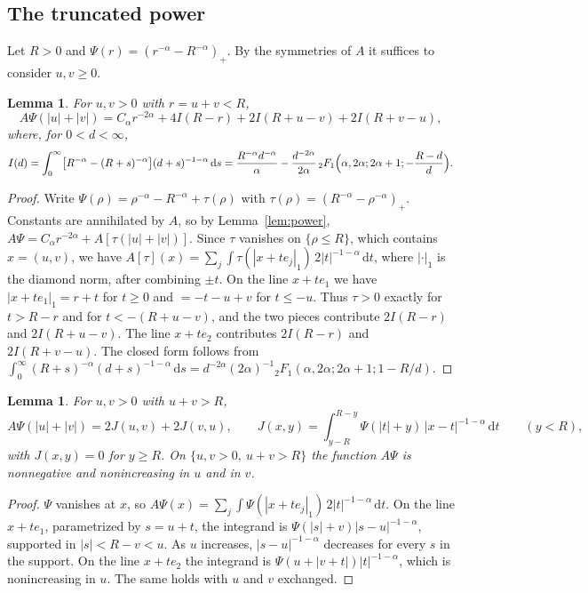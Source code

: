 \documentclass[11pt]{amsart}
\newtheorem{lemma}[equation]{Lemma}
\theoremstyle{definition}
\theoremstyle{remark}
\numberwithin{equation}{section}
\newcommand{\dd}{\,\mathrm{d}}
\begin{document}
\subsection{The truncated power} Let $R>0$ and $\Psi(r)=(r^{-\alpha}-R^{-\alpha})_+$. By the symmetries of $A$ it suffices to consider $u,v\ge0$.

\begin{lemma}\label{lem:inside}
For $u,v>0$ with $r=u+v<R$,
\[
A\Psi(|u|+|v|)=C_\alpha r^{-2\alpha}+4I(R-r)+2I(R+u-v)+2I(R+v-u),
\]
where, for $0<d<\infty$,
\[
I(d)=\int_0^\infty\bigl[R^{-\alpha}-(R+s)^{-\alpha}\bigr](d+s)^{-1-\alpha}\dd s=\frac{R^{-\alpha}d^{-\alpha}}{\alpha}-\frac{d^{-2\alpha}}{2\alpha}\,{}_2F_1\Bigl(\alpha,2\alpha;2\alpha+1;-\frac{R-d}{d}\Bigr).
\]
\end{lemma}

\begin{proof}
Write $\Psi(\rho)=\rho^{-\alpha}-R^{-\alpha}+\tau(\rho)$ with $\tau(\rho)=(R^{-\alpha}-\rho^{-\alpha})_+$. Constants are annihilated by $A$, so by Lemma~\ref{lem:power}, $A\Psi=C_\alpha r^{-2\alpha}+A[\tau(|u|+|v|)]$. Since $\tau$ vanishes on $\{\rho\le R\}$, which contains $x=(u,v)$, we have $A[\tau](x)=\sum_j\int\tau(|x+te_j|_1)\,2|t|^{-1-\alpha}\dd t$, where $|\cdot|_1$ is the diamond norm, after combining $\pm t$. On the line $x+te_1$ we have $|x+te_1|_1=r+t$ for $t\ge0$ and $=-t-u+v$ for $t\le-u$. Thus $\tau>0$ exactly for $t>R-r$ and for $t<-(R+u-v)$, and the two pieces contribute $2I(R-r)$ and $2I(R+u-v)$. The line $x+te_2$ contributes $2I(R-r)$ and $2I(R+v-u)$. The closed form follows from $\int_0^\infty(R+s)^{-\alpha}(d+s)^{-1-\alpha}\dd s=d^{-2\alpha}(2\alpha)^{-1}{}_2F_1(\alpha,2\alpha;2\alpha+1;1-R/d)$.
\end{proof}

\begin{lemma}\label{lem:outside}
For $u,v>0$ with $u+v>R$,
\[
A\Psi(|u|+|v|)=2J(u,v)+2J(v,u),\qquad J(x,y)=\int_{y-R}^{R-y}\Psi(|t|+y)\,|x-t|^{-1-\alpha}\dd t\qquad(y<R),
\]
with $J(x,y)=0$ for $y\ge R$. On $\{u,v>0,\ u+v>R\}$ the function $A\Psi$ is nonnegative and nonincreasing in $u$ and in $v$.
\end{lemma}

\begin{proof}
$\Psi$ vanishes at $x$, so $A\Psi(x)=\sum_j\int\Psi(|x+te_j|_1)\,2|t|^{-1-\alpha}\dd t$. On the line $x+te_1$, parametrized by $s=u+t$, the integrand is $\Psi(|s|+v)|s-u|^{-1-\alpha}$, supported in $|s|<R-v<u$. As $u$ increases, $|s-u|^{-1-\alpha}$ decreases for every $s$ in the support. On the line $x+te_2$ the integrand is $\Psi(u+|v+t|)|t|^{-1-\alpha}$, which is nonincreasing in $u$. The same holds with $u$ and $v$ exchanged.
\end{proof}
\end{document}
